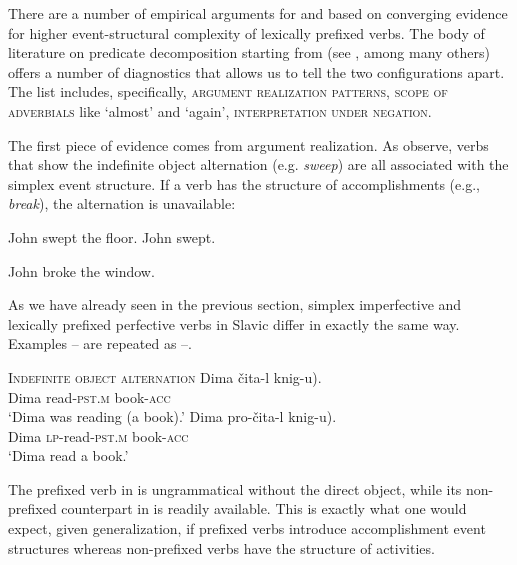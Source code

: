 \documentclass[output=paper,colorlinks,citecolor=brown]{langscibook}
\begin{document}
There are a number of empirical arguments for  and  based on converging evidence for higher event-structural complexity of lexically prefixed verbs. The body of literature on predicate decomposition starting from \citet{Dowty1979} (see \citealt{Stechow1996,Rappaport.Hovav.Levin1998,Rapp.vonStechow1999,Kratzer2000,Rothstein2004,Ramchand2008}, among many others) offers a number of diagnostics that allows us to tell the two configurations apart. The list includes, specifically, \textsc{argument realization patterns}, \textsc{scope of adverbials} like `almost' and `again', \textsc{interpretation under negation}.

The first piece of evidence comes from argument realization. As \citet{Rappaport.Hovav.Levin1998} observe, verbs that show the indefinite object alternation (e.g. \textit{sweep}) are all associated with the simplex event structure. If a verb has the structure of accomplishments (e.g., \textit{break}), the alternation is unavailable: 

\ea\label{tat:ex:35}
\ea    John swept the floor.\label{ex:tatevosov:35a}
\ex    John swept.\label{ex:tatevosov:35b}
\z
\z

\ea\label{tat:ex:36}
\ea    John broke the window.\label{ex:tatevosov:36a}
\label{ex:tatevosov:36b}
\z
\z

\noindent As we have already seen in the previous section, simplex imperfective and lexically prefixed perfective verbs in Slavic differ in exactly the same way. Examples -- are repeated as --.


\ea    \textsc{Indefinite object alternation}\label{tat:ex:37}
\ea
\gll Dima   čita-l   \minsp{(} knig-u).\\
    Dima  read-\textsc{pst.m}  {} book-\textsc{acc}\\
\glt  ‘Dima was reading (a book).’\label{ex:tatevosov:37a}
\ex
\gll    Dima    pro-čita-l   \minsp{*(} knig-u).\\
    Dima  \textsc{lp}-read-\textsc{pst.m}  {} book-\textsc{acc}\\
\glt  ‘Dima read a book.’\label{ex:tatevosov:37b}
\z
\z

\noindent The prefixed verb in  is ungrammatical without the direct object, while its non-prefixed counterpart in  is readily available. This is exactly what one would expect, given  generalization, if prefixed verbs introduce accomplishment event structures whereas non-prefixed verbs have the structure of activities.
\end{document}
